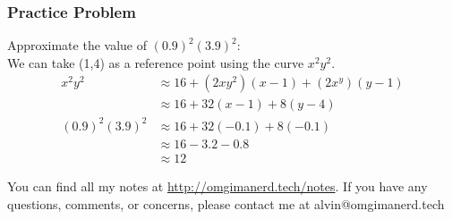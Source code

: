 \documentclass[letterpaper, 12pt]{math}
\begin{document}
\subsubsection*{Practice Problem}
Approximate the value of \( (0.9)^2(3.9)^2 \): \\
We can take (1,4) as a reference point using the curve \( x^2y^2 \).
\begin{align*}
  x^2y^2 &\approx 16+(2xy^2)(x-1)+(2x^y)(y-1) \\
  &\approx 16+32(x-1)+8(y-4) \\
  (0.9)^2(3.9)^2 &\approx 16+32(-0.1)+8(-0.1) \\
  &\approx 16-3.2-0.8 \\
  &\approx 12
\end{align*}

\begin{center}
  You can find all my notes at \url{http://omgimanerd.tech/notes}. If you have
  any questions, comments, or concerns, please contact me at
  alvin@omgimanerd.tech
\end{center}
\end{document}
